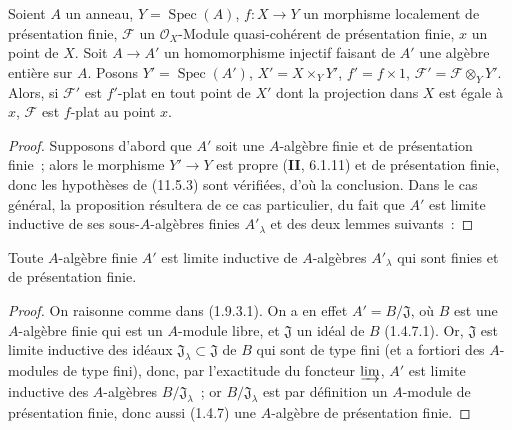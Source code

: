 \begin{proposition}[11.5.5]
\label{IV.11.5.5-fr}
Soient $A$ un anneau, $Y=\operatorname{Spec}(A)$, $f:X\to Y$ un morphisme
localement de présentation finie, $\mathcal F$ un $\mathcal O_X$-Module
quasi-cohérent de présentation finie, $x$ un point de $X$. Soit
$A\to A'$ un homomorphisme injectif faisant de $A'$ une algèbre entière sur $A$.
Posons $Y'=\operatorname{Spec}(A')$, $X'=X\times_Y Y'$, $f'=f\times1$,
$\mathcal F'=\mathcal F\otimes_Y Y'$. Alors, si $\mathcal F'$ est $f'$-plat en
tout point de $X'$ dont la projection dans $X$ est égale à $x$, $\mathcal F$ est
$f$-plat au point $x$.
\end{proposition}

\begin{proof}
Supposons d'abord que $A'$ soit une $A$-algèbre finie et de présentation finie~;
alors le morphisme $Y'\to Y$ est propre (\textbf{II}, 6.1.11) et de présentation
finie, donc les hypothèses de (11.5.3) sont vérifiées, d'où la conclusion. Dans
le cas général, la proposition résultera de ce cas particulier, du fait que $A'$
est limite inductive de ses sous-$A$-algèbres finies $A'_\lambda$ et des deux
lemmes suivants~:
\end{proof}

\begin{lemma}[11.5.5.1]
\label{IV.11.5.5.1-fr}
Toute $A$-algèbre finie $A'$ est limite inductive de $A$-algèbres $A'_\lambda$
qui sont finies et de présentation finie.
\end{lemma}

\begin{proof}
On raisonne comme dans (1.9.3.1). On a en effet $A'=B/\mathfrak J$, où $B$ est
une $A$-algèbre finie qui est un $A$-module libre, et $\mathfrak J$ un idéal de
$B$ (1.4.7.1). Or, $\mathfrak J$ est limite inductive des idéaux
$\mathfrak J_\lambda\subset\mathfrak J$ de $B$ qui sont de type fini (et a
fortiori des $A$-modules de type fini), donc, par l'exactitude du foncteur
$\varinjlim$, $A'$ est limite inductive des $A$-algèbres
$B/\mathfrak J_\lambda$~; or $B/\mathfrak J_\lambda$ est par définition un
$A$-module de présentation finie, donc aussi (1.4.7) une $A$-algèbre de
présentation finie.
\end{proof}

